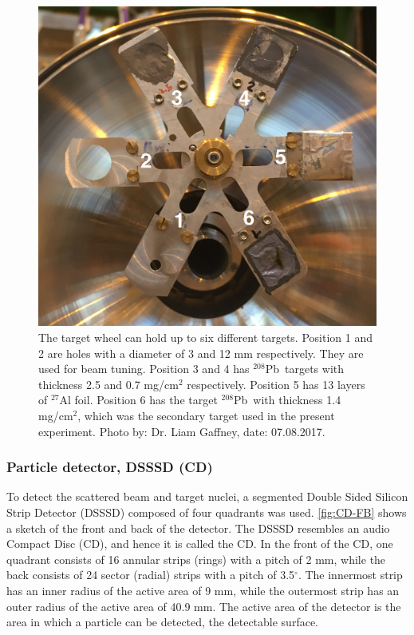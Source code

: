 \documentclass[twoside,english]{uiofysmaster/uiofysmaster}
\newcommand{\Pb}{$^{208}$Pb}
\let\orgautoref\autoref
\renewcommand{\autoref}
        {%
		 \def\sectionautorefname{Section}%
		 \def\subsectionautorefname{Section}%
		 \def\subsubsectionautorefname{Section}%
		 \def\chapterautorefname{Chapter}%
          \orgautoref}
\begin{document}
\begin{figure}[ht]
	\centering
	\includegraphics[width=0.8\linewidth]{Images/Target-wheel.png}
	\caption{The target wheel can hold up to six different targets. Position 1 and 2 are holes with a diameter of 3 and 12 mm respectively. They are used for beam tuning. Position 3 and 4 has \Pb\ targets with thickness 2.5 and 0.7 mg/cm$^2$ respectively. Position 5 has 13 layers of $^{27}$Al foil. Position 6 has the target \Pb\ with thickness 1.4 mg/cm$^2$, which was the secondary target used in the present experiment. Photo by: Dr. Liam Gaffney, date: 07.08.2017.}
	\label{fig:TWheel}
\end{figure}


\subsubsection{Particle detector, DSSSD (CD)}
To detect the scattered beam and target nuclei, a segmented Double Sided Silicon Strip Detector (DSSSD) composed of four quadrants was used. 
\autoref{fig:CD-FB} shows a sketch of the front and back of the detector. 
The DSSSD resembles an audio Compact Disc (CD), and hence it is called the CD. 
In the front of the CD, one quadrant consists of 16 annular strips (rings) with a pitch of 2 mm, while the back consists of 24 sector (radial) strips with a pitch of 3.5$^\circ$. 
The innermost strip has an inner radius of the active area of 9 mm, while the outermost strip has an outer radius of the active area of 40.9 mm. 
The active area of the detector is the area in which a particle can be detected, the detectable surface. 
\end{document}
